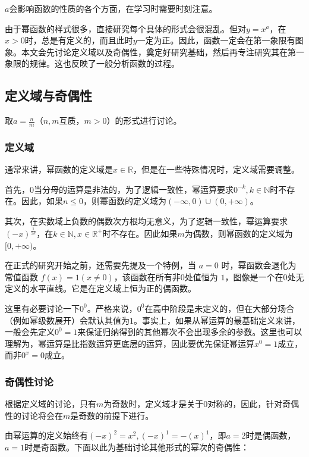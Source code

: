 $a$会影响函数的性质的各个方面，在学习时需要时刻注意。

由于幂函数的样式很多，直接研究每个具体的形式会很混乱。但对$y=x^a$，在$x>0$时，总是有定义的，而且此时$y$一定为正。因此，函数一定会在第一象限有图象。本文会先讨论定义域以及奇偶性，奠定好研究基础，然后再专注研究其在第一象限的规律。这也反映了一般分析函数的过程。



\subsection{定义域与奇偶性}

取$\displaystyle a=\frac{n}{m}$（$n,m$互质，$m>0$）的形式进行讨论。

\subsubsection{定义域}

通常来讲，幂函数的定义域是$x\in\mathbb{R}$，但是在一些特殊情况时，定义域需要调整。

首先，$0$当分母的运算是非法的，为了逻辑一致性，幂运算要求$0^{-k},k\in \mathbb{N}$时不存在。因此，如果$n\leq0$，则幂函数的定义域为$({-\infty},0)\cup(0,{+\infty})$。

其次，在实数域上负数的偶数次方根均无意义，为了逻辑一致性，幂运算要求$\displaystyle(-x)^\frac{1}{2k}$，在$k\in \mathbb{N},x\in\mathbb{R}^+$时不存在。因此如果${m}$为偶数，则幂函数的定义域为$[0,{+\infty})$。

在正式的研究开始之前，还需要先提及一个特例，当 $a = 0$ 时，幂函数会退化为常值函数 $f(x) = 1(x\neq0)$，该函数在所有非$0$处值恒为 $1$，图像是一个在$0$处无定义的水平直线。它是在定义域上恒为正的偶函数。

这里有必要讨论一下$0^0$。严格来说，$0^0$在高中阶段是未定义的，但在大部分场合（例如幂级数展开）会默认其值为$1$。事实上，如果从幂运算的最基础定义来讲，一般会先定义$0^0=1$来保证归纳得到的其他幂次不会出现多余的参数。这里也可以理解为，幂运算是比指数运算更底层的运算，因此要优先保证幂运算$x^0=1$成立，而非$0^x=0$成立。

\subsubsection{奇偶性讨论}

根据定义域的讨论，只有$m$为奇数时，定义域才是关于$0$对称的，因此，针对奇偶性的讨论将会在$m$是奇数的前提下进行。

由幂运算的定义始终有$(-x)^2=x^2,(-x)^1=-(x)^1$，即$a=2$时是偶函数，$a=1$时是奇函数。下面以此为基础讨论其他形式的幂次的奇偶性：

